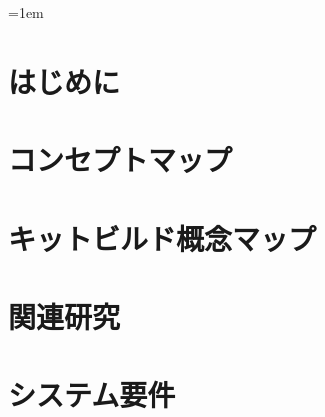 \addtolength{\headsep}{1cm}
\addtolength{\topmargin}{-2cm}
\addtolength{\textheight}{2cm}


\addtolength{\oddsidemargin}{-1.0cm}
\addtolength{\evensidemargin}{-3.6cm}
\addtolength{\textwidth}{5.5cm}



%
%


%
%


%
%


\setlength{\baselineskip}{1.2\baselineskip}

\pagestyle{plain}
\tableofcontents


\parindent=1em

\clearpage
\pagestyle{headings}

%
%
\chapter{はじめに}
\label{chap:introduction}


%
%
\chapter{コンセプトマップ}
\label{chap:conceptmap}


%
%
\chapter{キットビルド概念マップ}
\label{chap:kitbuild}


%
%
\chapter{関連研究}
\label{chap:refer}


%
%
\chapter{システム要件}
\label{chap:content}


